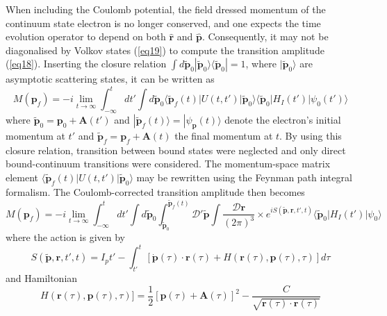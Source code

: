 \documentclass[11pt]{article}
\numberwithin{equation}{section}
\begin{document}
When including the Coulomb potential, the field dressed momentum of the continuum state electron is no longer conserved, and one expects the time evolution operator to depend on both $\hat{\textbf{r}}$ and $\hat{\textbf{p}}$. Consequently, it may not be diagonalised by Volkov states (\ref{eq19}) to compute the transition amplitude (\ref{eq18}). Inserting the closure relation $\int d\tilde{\textbf{p}}_0 |\tilde{\textbf{p}}_0\rangle \langle \tilde{\textbf{p}}_0 | = 1$, where $|\tilde{\textbf{p}}_0\rangle$ are asymptotic scattering states, it can be written as 
\begin{equation}
    M(\textbf{p}_f) = -i \lim_{t\rightarrow \infty} \int_{-\infty}^t dt'\int d\tilde{\textbf{p}}_0 \langle \tilde{\textbf{p}}_f(t)|U(t,t')|\tilde{\textbf{p}}_0\rangle \langle \tilde{\textbf{p}}_0|H_I(t')|\psi_0(t')\rangle
\end{equation}
where  $\tilde{\textbf{p}}_0 = \textbf{p}_0 + \textbf{A}(t')$ and $|\tilde{\textbf{p}}_f(t)\rangle = |\psi_{\textbf{p}}(t)\rangle$ denote the electron's initial momentum at $t'$ and $\tilde{\textbf{p}}_f = \textbf{p}_f + \textbf{A}(t)$ the final momentum at $t$. By using this closure relation, transition between bound states were neglected and only direct bound-continuum transitions were considered\cite{lai_2015_influence}.
\newline
The momentum-space matrix element $\langle \tilde{\textbf{p}}_f(t)|U(t,t')|\tilde{\textbf{p}}_0\rangle$ may be rewritten using the Feynman path integral formalism\cite{a2020_path}. The Coulomb-corrected transition amplitude  then becomes
\begin{equation}
    M(\textbf{p}_f) = -i \lim_{t\rightarrow\infty} \int_{-\infty}^t dt' \int d\tilde{\textbf{p}}_0 \int_{\tilde{\textbf{p}}_0}^{\tilde{\textbf{p}}_f(t)} \mathcal{D}'\tilde{\textbf{p}}\int \frac{\mathcal{D\textbf{r}}}{(2\pi)^3} \times e^{i S(\tilde{\textbf{p}},\textbf{r},t',t)} \langle \tilde{\textbf{p}}_0|H_I(t')|\psi_0\rangle
\end{equation}
where the action is given by 
\begin{equation} \label{eq27}
    S(\tilde{\textbf{p}},\textbf{r},t',t) = I_pt' - \int_{t'}^t [\dot{\textbf{p}}(\tau) \cdot \textbf{r}(\tau) + H(\textbf{r}(\tau),\textbf{p}(\tau),\tau)]d\tau
\end{equation}
and Hamiltonian
\begin{equation} \label{eq28}
     H(\textbf{r}(\tau),\textbf{p}(\tau),\tau)] = \frac{1}{2}[\textbf{p}(\tau)+\textbf{A}(\tau)]^2 -\frac{C}{\sqrt{\textbf{r}(\tau)\cdot\textbf{r}(\tau)}}
\end{equation}
\end{document}
